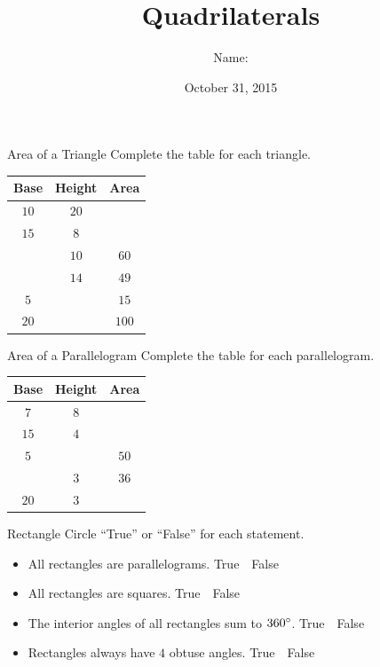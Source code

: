 \documentclass[12pt,letterpaper]{article}
\title{Quadrilaterals}
\author{Name: \underline{\hspace{5cm}}}
\date{October 31, 2015}
\begin{document}
\maketitle

\thispagestyle{empty}

\begin{problem}{Area of a Triangle}
 Complete the table for each triangle.

 \begin{center}
 \begin{tabular}{|c|c|c|}
  \hline
  Base & Height & Area \\
  \hline
  $10$ & $20$ & \\
  $15$ & $8$ & \\
  & $10$ & $60$ \\
  & $14$ & $49$ \\
  $5$ & & $15$ \\
  $20$ & & $100$\\
  \hline
 \end{tabular}
 \end{center}
\end{problem}

\begin{problem}{Area of a Parallelogram}
 Complete the table for each parallelogram.

 \begin{center}
 \begin{tabular}{|c|c|c|}
  \hline
  Base & Height & Area \\
  \hline
  $7$ & $8$ & \\
  $15$ & $4$ & \\
  $5$ & & $50$ \\
  & $3$ & $36$ \\
  $20$ & $3$ & \\
  \hline
 \end{tabular}
 \end{center}
\end{problem}

\begin{problem}{Rectangle}
 Circle ``True'' or ``False'' for each statement.
 \begin{itemize}
  \item All rectangles are parallelograms. \hfill True~~False
  \item All rectangles are squares. \hfill True~~False
  \item The interior angles of all rectangles sum to $360\degree$.
  \hfill True~~False
  \item Rectangles always have $4$ obtuse angles. \hfill True~~False
 \end{itemize}
\end{problem}
\end{document}
